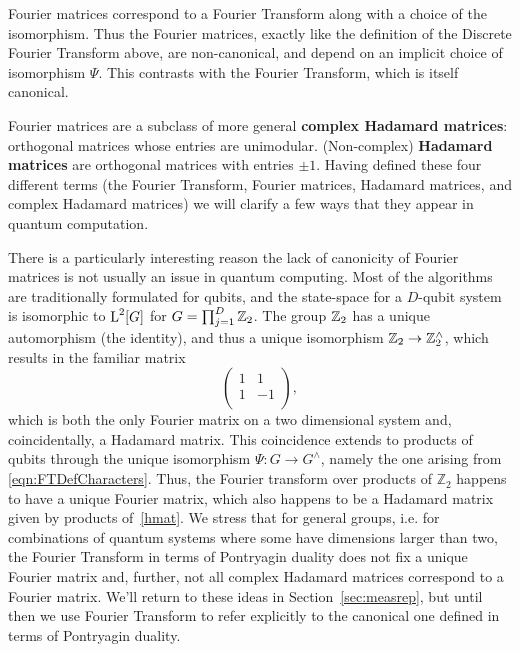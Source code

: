 Fourier matrices correspond to a Fourier Transform along with a choice of the isomorphism. Thus the Fourier matrices, exactly like the definition of the Discrete Fourier Transform above, are non-canonical, and depend on an implicit choice of isomorphism $\Psi$. This contrasts with the Fourier Transform, which is itself canonical.

Fourier matrices are a subclass of more general \textbf{complex Hadamard matrices}: orthogonal matrices whose entries are unimodular. (Non-complex) \textbf{Hadamard matrices} are orthogonal matrices with entries $\pm1$. Having defined these four different terms (the Fourier Transform, Fourier matrices, Hadamard matrices, and complex Hadamard matrices) we will clarify a few ways that they appear in quantum computation.

There is a particularly interesting reason the lack of canonicity of Fourier matrices is not usually an issue in quantum computing. Most of the algorithms are traditionally formulated for qubits, and the state-space for a $D$-qubit system is isomorphic to $\operatorname{L}^2[G]$ for $G = \prod_{j=1}^D \mathbb{Z}_{2}$. The group $\mathbb{Z}_{2}$ has a unique automorphism (the identity), and thus a unique isomorphism $\mathbb{Z}_{2} \rightarrow \mathbb{Z}_{2}^\wedge$, which results in the familiar matrix
\begin{equation}
\label{hmat}
\begin{pmatrix}1 & 1 \\
1 & -1 \\
\end{pmatrix},
\end{equation}
which is both the only Fourier matrix on a two dimensional system and, coincidentally, a Hadamard matrix. This coincidence extends to products of qubits through the unique isomorphism $\Psi : G \rightarrow G^\wedge$, namely the one arising from \eqref{eqn:FTDefCharacters}. Thus, the Fourier transform over products of $\mathbb{Z}_2$ happens to have a unique Fourier matrix, which also happens to be a Hadamard matrix given by products of~\ref{hmat}.  We stress that for general groups, i.e. for combinations of quantum systems where some have dimensions larger than two, the Fourier Transform in terms of Pontryagin duality does not fix a unique Fourier matrix and, further, not all complex Hadamard matrices correspond to a Fourier matrix. We'll return to these ideas in Section~\ref{sec:measrep}, but until then we use Fourier Transform to refer explicitly to the canonical one defined in terms of Pontryagin duality.

